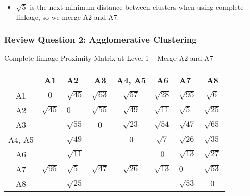 \documentclass[aspectratio=169, 10pt]{beamer}
\begin{document}
\begin{frame}[t]
    \begin{itemize}
        \item $\sqrt{5}$ is the next minimum distance between clusters when using complete-linkage, so we merge A2 and A7.
    \end{itemize}

\end{frame}

\begin{frame}[t]
    \frametitle{Review Question 2: Agglomerative Clustering}
    \small

    Complete-linkage Proximity Matrix at Level 1 -- Merge A2 and A7

    \begin{table}[]
        \scriptsize
        \begin{tabular}{c|cgcccgc}
                & A1          & A2                                 & A3          & A4, A5      & A6          & A7                                 & A8          \\ \hline
        A1      & $0$         & {\color[HTML]{9b9b9b} $\sqrt{45}$} & $\sqrt{63}$ & $\sqrt{57}$ & $\sqrt{28}$ & {\color[HTML]{3531FF} $\sqrt{95}$} & $\sqrt{6}$  \\
        A2      & {\color[HTML]{9b9b9b} $\sqrt{45}$} & {\color[HTML]{3531FF} $0        $} & {\color[HTML]{3531FF} $\sqrt{55}$} & {\color[HTML]{3531FF} $\sqrt{49}$} & {\color[HTML]{9b9b9b} $\sqrt{11}$} & {\color[HTML]{9b9b9b} $\sqrt{5}$ } & {\color[HTML]{9b9b9b} $\sqrt{25}$} \\
        A3      &             & {\color[HTML]{3531FF} $\sqrt{55}$} & 0           & $\sqrt{23}$ & $\sqrt{54}$ & {\color[HTML]{9b9b9b} $\sqrt{47}$} & $\sqrt{65}$ \\
        A4, A5  &             & {\color[HTML]{3531FF} $\sqrt{49}$} &             & $0        $ & $\sqrt{7 }$ & {\color[HTML]{9b9b9b} $\sqrt{26}$} & $\sqrt{35}$ \\
        A6      &             & {\color[HTML]{9b9b9b} $\sqrt{11}$} &             &             & $0        $ & {\color[HTML]{3531FF} $\sqrt{13}$} & $\sqrt{27}$ \\
        A7      & {\color[HTML]{3531FF} $\sqrt{95}$} & {\color[HTML]{9b9b9b} $\sqrt{5 }$} & {\color[HTML]{9b9b9b} $\sqrt{47}$} & {\color[HTML]{9b9b9b} $\sqrt{26}$} & {\color[HTML]{3531FF} $\sqrt{13}$} & {\color[HTML]{3531FF} $0        $} & {\color[HTML]{3531FF} $\sqrt{53}$} \\
        A8      &             & {\color[HTML]{9b9b9b} $\sqrt{25}$} &             &             &             & {\color[HTML]{3531FF} $\sqrt{53}$} & $0        $
        \end{tabular}
    \end{table}


\end{frame}
\end{document}
